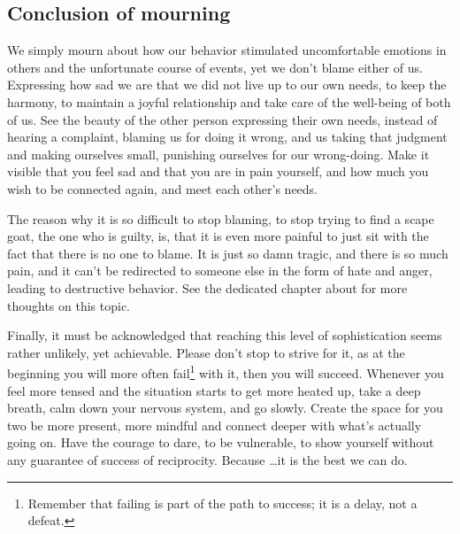 \subsection{Conclusion of mourning}\label{subsec:conclusion-of-mourning}

We simply mourn about how our behavior stimulated uncomfortable emotions in others and the unfortunate course of events, yet we don't blame either of us.
Expressing how sad we are that we did not live up to our own needs, to keep the harmony, to maintain a joyful relationship and take care of the well-being of both of us.
See the beauty of the other person expressing their own needs, instead of hearing a complaint, blaming us for doing it wrong, and us taking that judgment and making ourselves small, punishing ourselves for our wrong-doing.
Make it visible that you feel sad and that you are in pain yourself, and how much you wish to be connected again, and meet each other's needs.

The reason why it is so difficult to stop blaming, to stop trying to find a scape goat, the one who is guilty, is, that it is even more painful to just sit with the fact that there is no one to blame.
It is just so damn tragic, and there is so much pain, and it can't be redirected to someone else in the form of hate and anger, leading to destructive behavior.
See the dedicated chapter about  for more thoughts on this topic.

Finally, it must be acknowledged that reaching this level of sophistication seems rather unlikely, yet achievable.
Please don't stop to strive for it, as at the beginning you will more often fail\footnote{Remember that failing is part of the path to success; it is a delay, not a defeat.} with it, then you will succeed.
Whenever you feel more tensed and the situation starts to get more heated up, take a deep breath, calm down your nervous system, and go slowly.
Create the space for you two be more present, more mindful and connect deeper with what's actually going on.
Have the courage to dare, to be vulnerable, to show yourself without any guarantee of success of reciprocity.
Because \ldots it is the best we can do.
